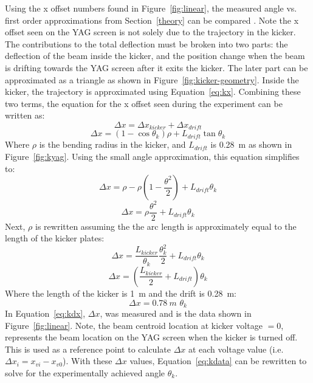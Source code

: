 Using the x offset numbers found in Figure~\ref{fig:linear}, 
the measured angle vs. first order approximations from Section~\ref{theory} can be compared . 
Note the x offset seen on the YAG screen is not solely due to the trajectory in the kicker.
The contributions to the total deflection must be broken into two parts: the deflection of the beam inside the kicker, 
and the position change when the beam is drifting towards the YAG screen after it exits the kicker.
The later part can be approximated as a triangle as shown in Figure~\ref{fig:kicker-geometry}.
Inside the kicker, the trajectory is approximated using Equation~\ref{eq:kx}. 
Combining these two terms, the equation for the x offset seen during the experiment
can be written as:
\begin{equation}
	\Delta x = \Delta x_{kicker} + \Delta x_{drift}
\end{equation}
\begin{equation}
	\Delta x = \left(1-\cos\theta_{k}\right)\rho + L_{drift} \tan \theta_{k}
	\label{eq:kdata}
\end{equation}
Where $\rho$ is the bending radius in the kicker, and $L_{drift}$ is \SI{0.28}{m} as shown in Figure~\ref{fig:kyag}.
Using the small angle approximation, this equation simplifies to:
\begin{equation}
	\Delta x = \rho - \rho \left(1-\frac{\theta^2}{2}\right) + L_{drift} \theta_{k}
\end{equation}
\begin{equation}
	\Delta x = \rho \frac{\theta^2}{2} + L_{drift} \theta_{k}
\end{equation}
Next, $\rho$ is rewritten assuming the the arc length is approximately equal 
to the length of the kicker plates:
\begin{equation}
	\Delta x = \frac{L_{kicker}}{\theta_{k}}\frac{\theta_{k}^2}{2} + L_{drift}\theta_{k}
\end{equation}
\begin{equation}
	\Delta x = \left(\frac{L_{kicker}}{2}+ L_{drift}\right)\theta_{k}
\end{equation}
Where the length of the kicker is \SI{1}{m} and the drift is \SI{0.28}{m}:
\begin{equation}
	\Delta x = \SI{0.78}{m}\,\,\theta_{k}
		\label{eq:kdx}
\end{equation}
In Equation~\ref{eq:kdx}, $\Delta x$, was measured and is the data shown in Figure~\ref{fig:linear}. 
Note, the beam centroid location at kicker voltage $=0$, 
represents the beam location on the YAG screen when the kicker is turned off.
This is used as a reference point to calculate $\Delta x$ at each voltage value
(i.e. $\Delta x_i = x_{vi} - x_{v0}$).
With these $\Delta x$ values, Equation~\ref{eq:kdata} can be rewritten to 
solve for the experimentally achieved angle $\theta_{k}$.

